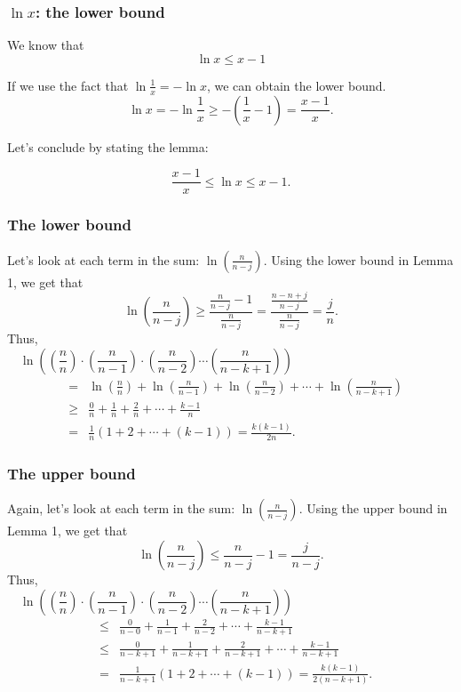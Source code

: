 \begin{frame}\frametitle{$\ln x$: the lower bound}
  We know that
  \[ \ln x \leq x - 1 \]
  
  If we use the fact that $\ln\frac{1}{x}=-\ln x$, we can obtain the
  lower bound.
  \[ \ln x = -\ln\frac{1}{x}\geq -\left(\frac{1}{x}-1\right)=\frac{x-1}{x}. \]

  \pause
  Let's conclude by stating the lemma:
  \begin{tcolorbox}
    \begin{lemma}
      \[\frac{x-1}{x}\leq \ln x\leq x-1.\]
    \end{lemma}
  \end{tcolorbox}
\end{frame}

\begin{frame}\frametitle{The lower bound }
  Let's look at each term in the sum: $\ln\left(\frac{n}{n-j}\right)$.
  Using the lower bound in Lemma 1, we get that
  \[
  \ln\left(\frac{n}{n-j}\right)
  \geq \frac{\frac{n}{n-j}-1}{\frac{n}{n-j}}
  = \frac{\frac{n-n+j}{n-j}}{\frac{n}{n-j}}
  = \frac{j}{n}.
  \]
  \pause
  Thus,
  \[
  \ln\left(\left(\frac{n}{n}\right)\cdot
  \left(\frac{n}{n-1}\right)\cdot\left(\frac{n}{n-2}\right)
  \cdots\left(\frac{n}{n-k+1}\right)\right)
  \qquad\qquad\qquad\qquad\qquad\qquad
  \]
  \begin{eqnarray*}
  &=& \ln\left(\frac{n}{n}\right)+
  \ln\left(\frac{n}{n-1}\right)+\ln\left(\frac{n}{n-2}\right) +
  \cdots+\ln\left(\frac{n}{n-k+1}\right)\\
  &\geq& \frac{0}{n}+\frac{1}{n}+\frac{2}{n}+\cdots+\frac{k-1}{n}\\
  &=& \frac{1}{n}\left(1+2+\cdots+(k-1)\right) = \frac{k(k-1)}{2n}.
  \end{eqnarray*}
\end{frame}

\begin{frame}\frametitle{The upper bound }
  Again, let's look at each term in the sum:
  $\ln\left(\frac{n}{n-j}\right)$.  Using the upper bound in Lemma 1,
  we get that
  \[
  \ln\left(\frac{n}{n-j}\right)
  \leq \frac{n}{n-j}-1=\frac{j}{n-j}.
  \]
  \pause
  Thus,
  \[
  \ln\left(\left(\frac{n}{n}\right)\cdot
  \left(\frac{n}{n-1}\right)\cdot\left(\frac{n}{n-2}\right)
  \cdots\left(\frac{n}{n-k+1}\right)\right)
  \qquad\qquad\qquad\qquad\qquad\qquad
  \]
  \begin{eqnarray*}
  &\leq& \frac{0}{n-0}+\frac{1}{n-1}+\frac{2}{n-2}+\cdots+\frac{k-1}{n-k+1}\\
  &\leq& \frac{0}{n-k+1}+\frac{1}{n-k+1}+\frac{2}{n-k+1}+\cdots+\frac{k-1}{n-k+1}\\
  &=& \frac{1}{n-k+1}\left(1+2+\cdots+(k-1)\right) = \frac{k(k-1)}{2(n-k+1)}.
  \end{eqnarray*}
\end{frame}

